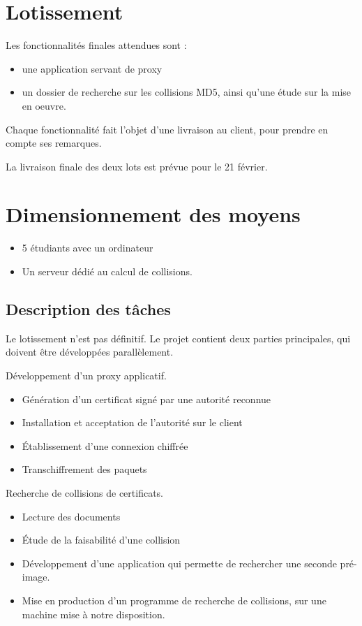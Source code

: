 \documentclass[a4paper,11pt,french]{article}
\begin{document}
\newpage
\section{Lotissement}

Les fonctionnalités finales attendues sont :
\begin{itemize}
\item une application servant de proxy  
\item un dossier de recherche sur les collisions MD5, ainsi qu'une étude sur la mise en oeuvre.
\end{itemize}

Chaque fonctionnalité fait l'objet d'une livraison au client, pour prendre en compte ses remarques.

La livraison finale des deux lots est prévue pour le 21 février.

\newpage
\section{Dimensionnement des moyens}

\begin{itemize}
\item 5 étudiants avec un ordinateur
\item Un serveur dédié au calcul de collisions.
\end{itemize}

\subsection{Description des tâches}

Le lotissement n'est pas définitif. Le projet contient deux parties principales, qui doivent être développées parallèlement.

Développement d'un proxy applicatif.
\begin{itemize}
\item Génération d'un certificat signé par une autorité reconnue
\item Installation et acceptation de l'autorité sur le client
\item Établissement d'une connexion chiffrée
\item Transchiffrement des paquets
\end{itemize}
Recherche de collisions de certificats.
\begin{itemize}
\item Lecture des documents
\item Étude de la faisabilité d'une collision
\item Développement d'une application qui permette de rechercher une seconde pré-image.
\item Mise en production d'un programme de recherche de collisions, sur une machine mise à notre disposition.
\end{itemize}
\end{document}
